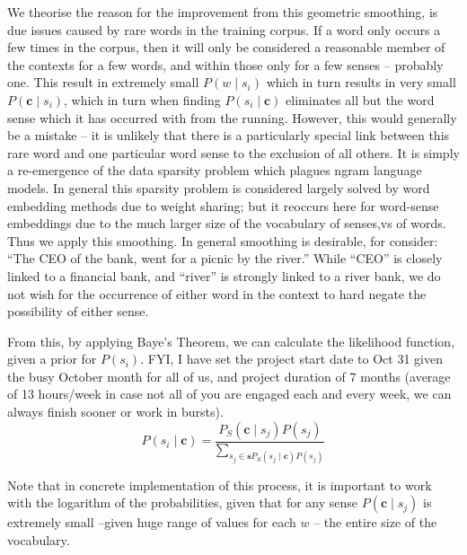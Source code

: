 \documentclass{sig-alternate}
\renewcommand{\c}{\mathbf{c}}
\begin{document}
We theorise the reason for the improvement from this geometric smoothing, is due issues caused by rare words in the training corpus. If a word only occurs a few times in the corpus, then it will only be considered a reasonable member of the contexts for a few words, and within those only for a few senses -- probably one. This result in extremely small $P(w \mid s_i)$ which in turn results in very small $P(\c \mid s_i)$, which in turn when finding $P(s_{i} \mid \c)$ eliminates all but the word sense which it has occurred with from the running. However, this would generally be a mistake -- it is unlikely that there is a particularly special link between this rare word and one particular word sense to the exclusion of all others. It is simply a re-emergence of the data sparsity problem which plagues ngram language models. In general this sparsity problem is considered largely solved by word embedding methods due to weight sharing; but it reoccurs here for word-sense embeddings due to the much larger size of the vocabulary of senses,vs of words. Thus we apply this smoothing. In general smoothing is desirable, for consider: \enquote{The CEO of the bank, went for a picnic by the river.} While \enquote{CEO} is closely linked to a financial bank, and \enquote{river} is strongly linked to a river bank, we do not wish for the occurrence of either word in the context to hard negate the possibility of either sense.


From this, by applying Baye's Theorem, we can calculate the likelihood function, given a prior for $P(s_i)$.
FYI, I have set the project start date to Oct 31 given the busy October month for all of us, and project duration of 7 months (average of 13 hours/week in case not all of you are engaged each and every week, we can always finish sooner or work in bursts). 
\begin{equation} \label{eq:generalwsd}
P(s_{i} \mid \c) = \dfrac{P_S(\c \mid s_{j})P(s_{j})}{\sum_{s_{j}\in\mathbf{s}P_S(s_{j} \mid \c)P(s_{j})}}
\end{equation}

Note that in concrete implementation of this process, it is important to work with the logarithm of the probabilities, given that for any sense $P(\c \mid s_j)$ is extremely small --given huge range of values for each $w$ -- the entire size of the vocabulary.
\end{document}
